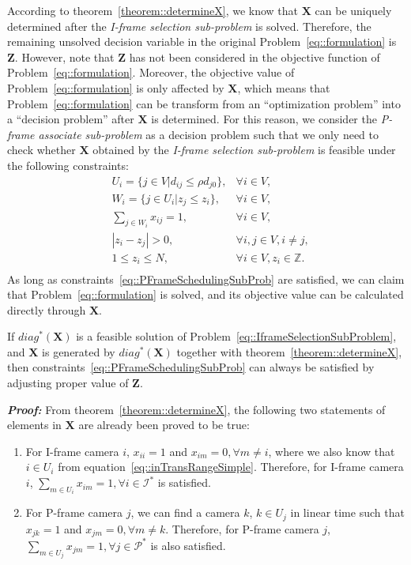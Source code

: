 According to theorem~\ref{theorem::determineX}, we know that $\mathbf{X}$ can be uniquely determined after the \emph{I-frame selection sub-problem} is solved.
Therefore, the remaining unsolved decision variable in the original Problem~\eqref{eq::formulation} is $\mathbf{Z}$.
However, note that $\mathbf{Z}$ has not been considered in the objective function of Problem~\eqref{eq::formulation}.
Moreover, the objective value of Problem~\eqref{eq::formulation} is only affected by $\mathbf{X}$, which means that Problem~\eqref{eq::formulation} can be transform from an ``optimization problem'' into a ``decision problem'' after $\mathbf{X}$ is determined.
For this reason, we consider the \emph{P-frame associate sub-problem} as a decision problem such that we only need to check whether $\mathbf{X}$ obtained by the \emph{I-frame selection sub-problem} is feasible under the following constraints:
\begin{align}
	&U_i = \{ j \in V | d_{ij} \leq \rho d_{j0} \}, &\forall i \in V, \nonumber \\
	&W_i = \{ j \in U_i | z_j \leq z_i \}, &\forall i \in V, \nonumber \\
	&\sum_{j \in W_i} x_{ij} = 1, &\forall i \in V, \nonumber \\
	&|z_i - z_j| > 0, &\forall i,j \in V, i \neq j, \nonumber \\
	&1 \leq z_i \leq N, &\forall i \in V, z_i \in \mathbb{Z}. \nonumber \\
\label{eq::PFrameSchedulingSubProb}
\end{align}
As long as constraints~\eqref{eq::PFrameSchedulingSubProb} are satisfied, we can claim that Problem~\eqref{eq::formulation} is solved, and its objective value can be calculated directly through $\mathbf{X}$.
%
\begin{mythm}
If $diag^*(\mathbf{X})$ is a feasible solution of Problem~\eqref{eq::IframeSelectionSubProblem}, and $\mathbf{X}$ is generated by $diag^*(\mathbf{X})$ together with theorem~\ref{theorem::determineX}, then constraints~\eqref{eq::PFrameSchedulingSubProb} can always be satisfied by adjusting proper value of $\mathbf{Z}$.
\label{theorem::IFrameSolalwaysFeasible}
\end{mythm}
\textbf{\emph{Proof:}}
From theorem~\ref{theorem::determineX}, the following two statements of elements in $\mathbf{X}$ are already been proved to be true:
\begin{enumerate}
\item For I-frame camera $i$, $x_{ii}=1$ and ${x_{im} = 0}, {\forall m \neq i}$, where we also know that $i \in U_i$ from equation~\eqref{eq::inTransRangeSimple}.
Therefore, for I-frame camera $i$, ${\underset{m \in U_i}{\sum} x_{im}=1},{\forall i \in \mathcal{I}^*}$ is satisfied.
\item For P-frame camera $j$, we can find a camera $k$, ${k \in U_j}$ in linear time such that ${x_{jk} = 1}$ and ${x_{jm}=0}, \forall m \neq k$.
Therefore, for P-frame camera $j$, ${\underset{m \in U_j}{\sum} x_{jm}=1},{\forall j \in \mathcal{P}^*}$ is also satisfied.
\end{enumerate}
